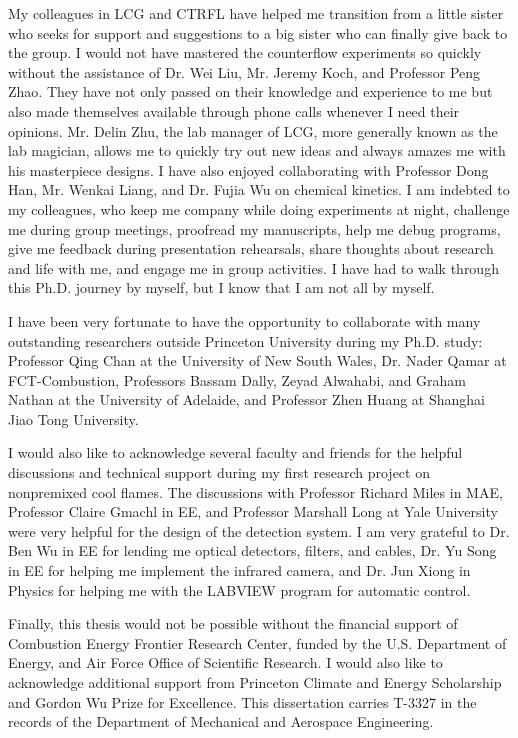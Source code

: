 {My colleagues in LCG and CTRFL have helped me transition from a little sister who seeks for support and suggestions to a big sister who can finally give back to the group.  I would not have mastered the counterflow experiments so quickly without the assistance of Dr. Wei Liu, Mr. Jeremy Koch, and Professor Peng Zhao.  They have not only passed on their knowledge and experience to me but also made themselves available through phone calls whenever I need their opinions.  Mr. Delin Zhu, the lab manager of LCG, more generally known as the lab magician, allows me to quickly try out new ideas and always amazes me with his masterpiece designs.  I have also enjoyed collaborating with Professor Dong Han, Mr. Wenkai Liang, and Dr. Fujia Wu on chemical kinetics.  I am indebted to my colleagues, who keep me company while doing experiments at night, challenge me during group meetings, proofread my manuscripts, help me debug programs, give me feedback during presentation rehearsals, share thoughts about research and life with me, and engage me in group activities.  I have had to walk through this Ph.D. journey by myself, but I know that I am not all by myself.       

I have been very fortunate to have the opportunity to collaborate with many outstanding researchers outside Princeton University during my Ph.D. study:  Professor Qing Chan at the University of New South Wales, Dr. Nader Qamar at FCT-Combustion, Professors Bassam Dally, Zeyad Alwahabi, and Graham Nathan at the University of Adelaide, and Professor Zhen Huang at Shanghai Jiao Tong University.   

I would also like to acknowledge several faculty and friends for the helpful discussions and technical support during my first research project on nonpremixed cool flames.  The discussions with Professor Richard Miles in MAE, Professor Claire Gmachl in EE, and Professor Marshall Long at Yale University were very helpful for the design of the detection system.  I am very grateful to Dr. Ben Wu in EE for lending me optical detectors, filters, and cables, Dr. Yu Song in EE for helping me implement the infrared camera, and Dr. Jun Xiong in Physics for helping me with the LABVIEW program for automatic control.

Finally, this thesis would not be possible without the financial support of Combustion Energy Frontier Research Center, funded by the U.S. Department of Energy, and Air Force Office of Scientific Research.  I would also like to acknowledge additional support from Princeton Climate and Energy Scholarship and Gordon Wu Prize for Excellence.  This dissertation carries T-3327 in the records of the Department of Mechanical and Aerospace Engineering.}
